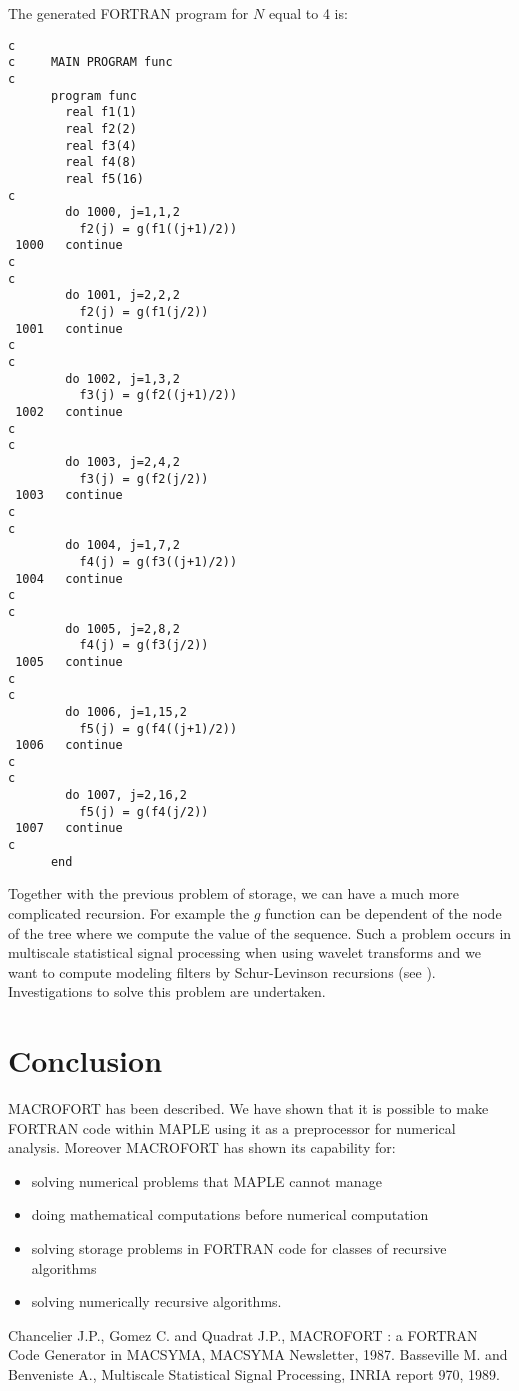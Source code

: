 The generated FORTRAN program for $N$ equal to 4 is:
\begin{verbatim}
c      
c     MAIN PROGRAM func
c      
      program func
        real f1(1)
        real f2(2)
        real f3(4)
        real f4(8)
        real f5(16)
c         
        do 1000, j=1,1,2
          f2(j) = g(f1((j+1)/2))
 1000   continue
c       
c         
        do 1001, j=2,2,2
          f2(j) = g(f1(j/2))
 1001   continue
c       
c         
        do 1002, j=1,3,2
          f3(j) = g(f2((j+1)/2))
 1002   continue
c       
c         
        do 1003, j=2,4,2
          f3(j) = g(f2(j/2))
 1003   continue
c       
c         
        do 1004, j=1,7,2
          f4(j) = g(f3((j+1)/2))
 1004   continue
c       
c         
        do 1005, j=2,8,2
          f4(j) = g(f3(j/2))
 1005   continue
c       
c         
        do 1006, j=1,15,2
          f5(j) = g(f4((j+1)/2))
 1006   continue
c       
c         
        do 1007, j=2,16,2
          f5(j) = g(f4(j/2))
 1007   continue
c       
      end
\end{verbatim}

Together with the previous problem of storage, we can have a much more
complicated recursion. For example the $g$ function can be dependent of
the node of the tree where we compute the value of the sequence.
Such a problem occurs in multiscale statistical signal processing when using
wavelet transforms and we want to compute modeling filters by Schur-Levinson
recursions (see \cite{wave}). Investigations to solve this problem are
undertaken.

\section{Conclusion}
\label{conclusion}

MACROFORT has been described. We have shown that it is possible to 
make FORTRAN code within MAPLE using it as a preprocessor for numerical
analysis. Moreover MACROFORT has shown its capability for:
\begin{itemize}
  \item solving numerical problems that MAPLE cannot manage
  \item doing mathematical computations before numerical computation
  \item solving storage problems in FORTRAN code for classes of recursive
algorithms
  \item solving numerically recursive algorithms.
\end{itemize}

\begin{thebibliography}{99}
   Chancelier J.P., Gomez C. and Quadrat J.P.,
    MACROFORT : a FORTRAN Code Generator in MACSYMA, MACSYMA Newsletter,
    1987.
   Basseville M. and Benveniste A., Multiscale Statistical
    Signal Processing, INRIA report 970, 1989.
\end{thebibliography}


